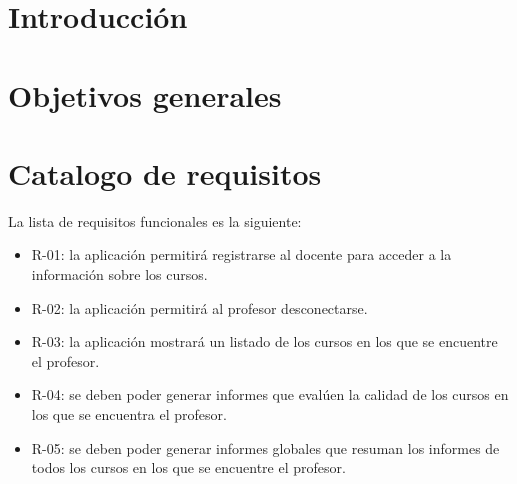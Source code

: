 
\section{Introducción}

\section{Objetivos generales}

\section{Catalogo de requisitos}
La lista de requisitos funcionales es la siguiente:
\begin{itemize}
	\item R-01: la aplicación permitirá registrarse al docente para acceder a la información sobre los cursos.
	\item R-02: la aplicación permitirá al profesor desconectarse.
	\item R-03: la aplicación mostrará un listado de los cursos en los que se encuentre el profesor.
	\item R-04: se deben poder generar informes que evalúen la calidad de los cursos en los que se encuentra el profesor.
	\item R-05: se deben poder generar informes globales que resuman los informes de todos los cursos en los que se encuentre el profesor.
\end{itemize}

